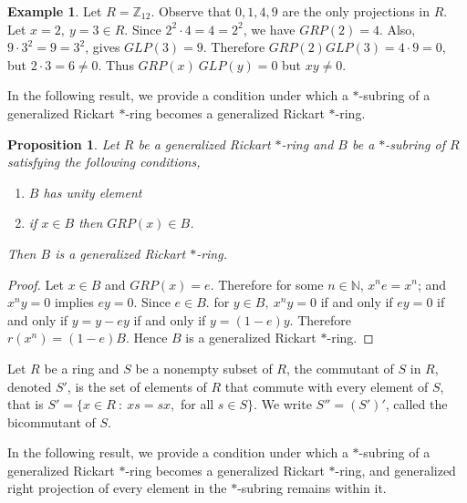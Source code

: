 \documentclass[11pt, one side,emlines]{amsart}
\newtheorem{proposition}[lemma]{Proposition}
\theoremstyle{definition}
\newtheorem{example}[lemma]{Example}
\numberwithin{equation}{section} \thispagestyle{empty} \voffset
\begin{document}
    \begin{example} Let $R=\mathbb{Z}_{12} $. Observe that $0, 1, 4, 9$ are the only projections in $R$.
	Let $ x=2,~y=3 \in R$. Since $2^2\cdot  4=4=2^2$, we have $GRP(2)=4$. 
	Also, $9\cdot 3^2=9=3^2$, gives $GLP(3)=9$. Therefore $GRP (2) GLP (3)=4 \cdot 9=0$, but $2 \cdot3=6 \ne 0$. Thus $GRP(x)~GLP(y)=0$ but $xy\ne0$. 
  \end{example}

In the following result, we provide a condition under which a $*$-subring of a generalized Rickart $*$-ring becomes a generalized Rickart $*$-ring.

\begin{proposition} \label{s2pr4} 	Let $R$ be a generalized  Rickart $ *$-ring and $B$ be a $*$-subring of $R$        satisfying the following conditions, 
	\begin{enumerate}
		\item $B$ has unity element 
		\item if $x\in B$ then $GRP(x)\in B$.
	\end{enumerate}
	Then $B$ is a generalized  Rickart $*$-ring.
\end{proposition}
\begin{proof} Let $x\in B$ and $GRP(x)=e$. Therefore for some $ n\in\mathbb N $, $x^ne=x^n$; and $x^ny=0$ implies $ey=0$.	Since $e\in B$. for $y\in B,~ x^ny=0$ if and only if $ey=0$ if and only if $y=y-ey$ if and only if 
	$y=(1-e)y$. Therefore $r(x^n)=(1-e)B$. Hence $B$ is a generalized  Rickart $*$-ring. 
\end{proof}

Let $R$ be a ring and $S$ be a nonempty subset of $R$, the
commutant of $S$ in $R$, denoted $S'$, is the set of elements of $R$ that commute
with every element of $S$, that is $S'=\{ x \in R ~:~ xs=sx,$ for all $s\in S\}$.
	We write $S''=(S')'$, called the bicommutant of $S$.
	
	In the following result, we provide a condition under which a $*$-subring of a generalized Rickart $*$-ring becomes a generalized Rickart $*$-ring, and generalized right projection of every element in the $*$-subring remains within it. 
	
\end{document}
